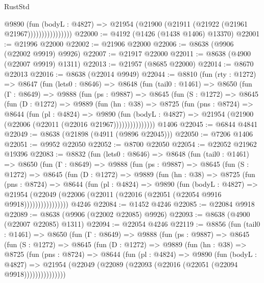 \begin{lexlean}{RustStd}
\begin{coremodule}
                        @9890
                          (fun (bodyL : @4827) =>
                          @21954 (@21900 (@21911 (@21922 (@21961 @21967))))))))))))))))
@22000 := @4192 (@1426 (@1438 @1406) @13370)
@22001 := @21996 @22000
@22002 := @21906 @22000
@22006 := @8638 (@9906 (@22002 @9919) @9926)
@22007 := @21917 @22000
@22011 := @8638 (@4900 (@22007 @9919) @1311)
@22013 := @21957 (@8685 @22000)
@22014 := @8670 @22013
@22016 := @8638 (@22014 @9949)
@22044 := @8810
    (fun (rty : @1272) =>
    @8647
      (fun (lets0 : @8646) =>
      @8648
        (fun (tail0 : @1461) =>
        @8650
          (fun (Γ : @8649) =>
          @9888
            (fun (ps : @9887) =>
            @8645
              (fun (S : @1272) =>
              @8645
                (fun (D : @1272) =>
                @9889
                  (fun (hn : @38) =>
                  @8725
                    (fun (pns : @8724) =>
                    @8644
                      (fun (pl : @4824) =>
                      @9890
                        (fun (bodyL : @4827) =>
                        @21954 (@21900 (@22006 (@22011 (@22016 @21967)))))))))))))))
    @1406
@22045 := @6844 @4841
@22049 := @8638 (@21898 (@4911 (@9896 @22045)))
@22050 := @7206 @1406
@22051 := @9952 @22050
@22052 := @8700 @22050
@22054 := @22052 @21962 @19396
@22083 := @8832
    (fun (lets0 : @8646) =>
    @8648
      (fun (tail0 : @1461) =>
      @8650
        (fun (Γ : @8649) =>
        @9888
          (fun (ps : @9887) =>
          @8645
            (fun (S : @1272) =>
            @8645
              (fun (D : @1272) =>
              @9889
                (fun (hn : @38) =>
                @8725
                  (fun (pns : @8724) =>
                  @8644
                    (fun (pl : @4824) =>
                    @9890
                      (fun (bodyL : @4827) =>
                      @21954
                        (@22049 (@22006 (@22011 (@22016 (@22051 (@22054 @9916 @9918))))))))))))))))
    @4246
@22084 := @1452 @4246
@22085 := @22084 @9918
@22089 := @8638 (@9906 (@22002 @22085) @9926)
@22093 := @8638 (@4900 (@22007 @22085) @1311)
@22094 := @22054 @4246
@22119 := @8856
    (fun (tail0 : @1461) =>
    @8650
      (fun (Γ : @8649) =>
      @9888
        (fun (ps : @9887) =>
        @8645
          (fun (S : @1272) =>
          @8645
            (fun (D : @1272) =>
            @9889
              (fun (hn : @38) =>
              @8725
                (fun (pns : @8724) =>
                @8644
                  (fun (pl : @4824) =>
                  @9890
                    (fun (bodyL : @4827) =>
                    @21954 (@22049 (@22089 (@22093 (@22016 (@22051 (@22094 @9918)))))))))))))))

\end{coremodule}
\end{lexlean}
